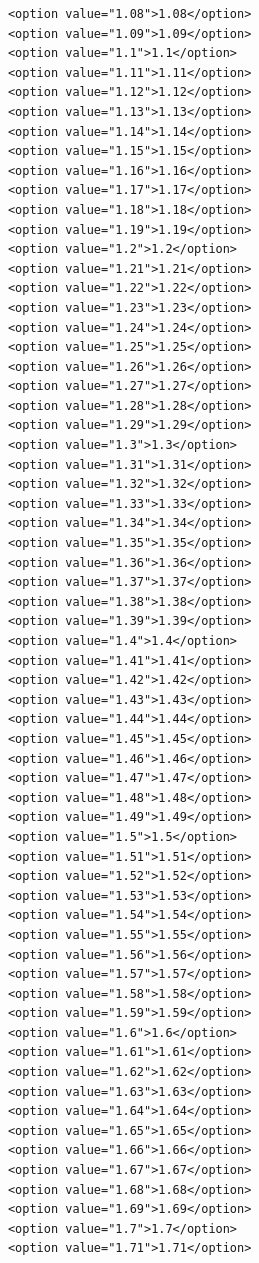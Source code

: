 \documentclass[
  letterpaper,
  DIV=11,
  numbers=noendperiod]{scrartcl}
\begin{document}
\begin{verbatim}
      <option value="1.08">1.08</option>
      <option value="1.09">1.09</option>
      <option value="1.1">1.1</option>
      <option value="1.11">1.11</option>
      <option value="1.12">1.12</option>
      <option value="1.13">1.13</option>
      <option value="1.14">1.14</option>
      <option value="1.15">1.15</option>
      <option value="1.16">1.16</option>
      <option value="1.17">1.17</option>
      <option value="1.18">1.18</option>
      <option value="1.19">1.19</option>
      <option value="1.2">1.2</option>
      <option value="1.21">1.21</option>
      <option value="1.22">1.22</option>
      <option value="1.23">1.23</option>
      <option value="1.24">1.24</option>
      <option value="1.25">1.25</option>
      <option value="1.26">1.26</option>
      <option value="1.27">1.27</option>
      <option value="1.28">1.28</option>
      <option value="1.29">1.29</option>
      <option value="1.3">1.3</option>
      <option value="1.31">1.31</option>
      <option value="1.32">1.32</option>
      <option value="1.33">1.33</option>
      <option value="1.34">1.34</option>
      <option value="1.35">1.35</option>
      <option value="1.36">1.36</option>
      <option value="1.37">1.37</option>
      <option value="1.38">1.38</option>
      <option value="1.39">1.39</option>
      <option value="1.4">1.4</option>
      <option value="1.41">1.41</option>
      <option value="1.42">1.42</option>
      <option value="1.43">1.43</option>
      <option value="1.44">1.44</option>
      <option value="1.45">1.45</option>
      <option value="1.46">1.46</option>
      <option value="1.47">1.47</option>
      <option value="1.48">1.48</option>
      <option value="1.49">1.49</option>
      <option value="1.5">1.5</option>
      <option value="1.51">1.51</option>
      <option value="1.52">1.52</option>
      <option value="1.53">1.53</option>
      <option value="1.54">1.54</option>
      <option value="1.55">1.55</option>
      <option value="1.56">1.56</option>
      <option value="1.57">1.57</option>
      <option value="1.58">1.58</option>
      <option value="1.59">1.59</option>
      <option value="1.6">1.6</option>
      <option value="1.61">1.61</option>
      <option value="1.62">1.62</option>
      <option value="1.63">1.63</option>
      <option value="1.64">1.64</option>
      <option value="1.65">1.65</option>
      <option value="1.66">1.66</option>
      <option value="1.67">1.67</option>
      <option value="1.68">1.68</option>
      <option value="1.69">1.69</option>
      <option value="1.7">1.7</option>
      <option value="1.71">1.71</option>

\end{verbatim}
\end{document}
